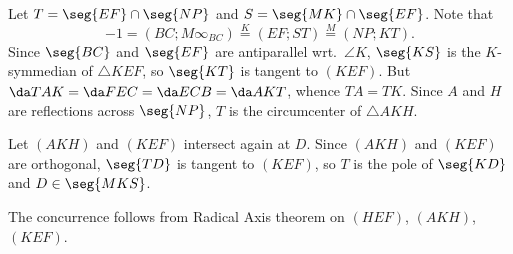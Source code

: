 Let $T=\seg{EF}\cap\seg{NP}$ and $S=\seg{MK}\cap\seg{EF}$. Note that \[-1=(BC;M\infty_{BC})\stackrel K=(EF;ST)\stackrel M=(NP;KT).\]
Since $\seg{BC}$ and $\seg{EF}$ are antiparallel wrt.\ $\angle K$, $\seg{KS}$ is the $K$-symmedian of $\triangle KEF$, so $\seg{KT}$ is tangent to $(KEF)$. But $\da TAK=\da FEC=\da ECB=\da AKT$, whence $TA=TK$. Since $A$ and $H$ are reflections across $\seg{NP}$, $T$ is the circumcenter of $\triangle AKH$.

Let $(AKH)$ and $(KEF)$ intersect again at $D$. Since $(AKH)$ and $(KEF)$ are orthogonal, $\seg{TD}$ is tangent to $(KEF)$, so $T$ is the pole of $\seg{KD}$ and $D\in\seg{MKS}$.

The concurrence follows from Radical Axis theorem on $(HEF)$, $(AKH)$, $(KEF)$.
